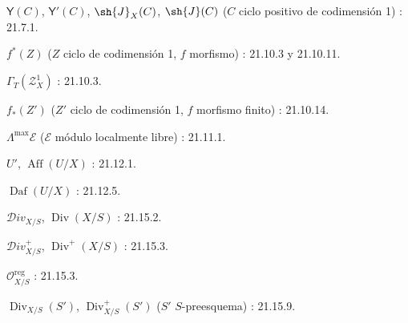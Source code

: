 $\boldsymbol{\mathsf{Y}}(C)$, $\boldsymbol{\mathsf{Y}}'(C)$, $\sh{J}_X(C)$, $\sh{J}(C)$
($C$ ciclo positivo de codimensión 1) : 21.7.1.

$f^*(Z)$ ($Z$ ciclo de codimensión 1, $f$ morfismo) : 21.10.3 y 21.10.11.

$\varGamma_T(\mathscr Z_X^1)$ : 21.10.3.

$f_*(Z')$ ($Z'$ ciclo de codimensión 1, $f$ morfismo finito) : 21.10.14.

$\Lambda^{\max}\mathcal E$ ($\mathcal E$ módulo localmente libre) : 21.11.1.

$U'$, $\operatorname{Aff}(U/X)$ : 21.12.1.

$\operatorname{Daf}(U/X)$ : 21.12.5.

$\mathcal{D}iv_{X/S}$, $\operatorname{Div}(X/S)$ : 21.15.2.

$\mathcal{D}iv_{X/S}^+$, $\operatorname{Div}^+(X/S)$ : 21.15.3.

$\mathcal O_{X/S}^{\mathrm{reg}}$ : 21.15.3.

$\operatorname{Div}_{X/S}(S')$, $\operatorname{Div}_{X/S}^+(S')$
($S'$ $S$-preesquema) : 21.15.9.

\endgroup
